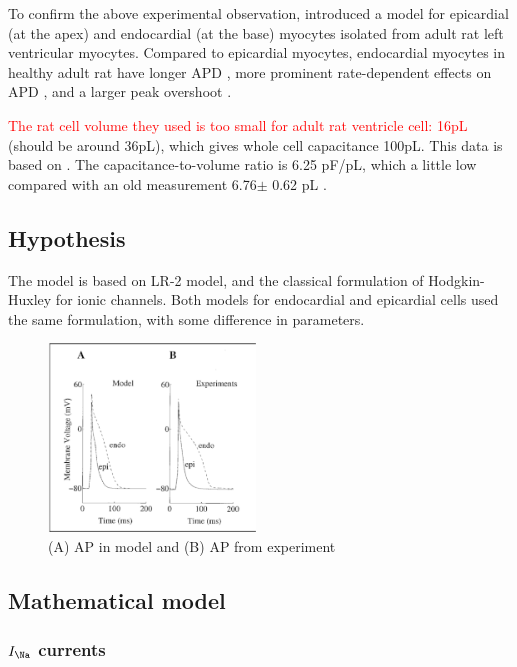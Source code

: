 To confirm the above experimental observation, \citep{pandit2001} introduced a
model for epicardial (at the apex) and endocardial (at the base) myocytes
isolated from adult rat left ventricular myocytes. Compared to epicardial
myocytes, endocardial myocytes in healthy adult rat have longer APD
\citep{clark1993}, more prominent rate-dependent effects on APD
\citep{shimoni1995}, and a larger peak overshoot \citep{shipsey1997,volk1999}.

\textcolor{red}{The rat cell volume they used is too small for adult rat
ventricle cell: 16pL} (should be around 36pL), which gives whole cell
capacitance 100pL. This data is based on \citep{Bouchard1995}.
The capacitance-to-volume ratio is 6.25 pF/pL, which a little low compared with
an old measurement 6.76$\pm$ 0.62 pL \citep{satoh1996svr}.

\subsection{Hypothesis}


The model is based on LR-2 model, and the classical formulation of
Hodgkin-Huxley \citep{hodgkin1952ap} for ionic channels. Both models for
endocardial and epicardial cells used the same formulation, with some
difference in parameters.

\begin{figure}[hbt]
  \centerline{\includegraphics[height=5cm]{./images/Pandit_AP_epi_endo.eps}}
\caption{(A) AP in model and (B) AP from experiment}
\label{fig:Pandit_AP}
\end{figure}

\subsection{Mathematical model}

\subsubsection{$I_\Na$ currents}

